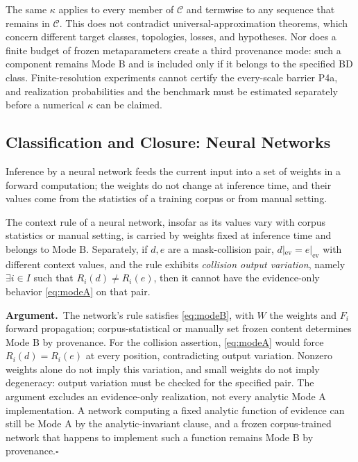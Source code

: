 \documentclass[twoside,11pt]{article}
\newcommand{\argument}{\par\medskip\noindent\textbf{Argument.}\ }
\newcommand{\qedbox}{\hfill$\square$}
\newcommand{\ev}{\mathrm{ev}}
\begin{document}
The same $\kappa$ applies to every member of $\mathcal{C}$ and termwise to any sequence that remains in $\mathcal{C}$. This does not contradict universal-approximation theorems, which concern different target classes, topologies, losses, and hypotheses. Nor does a finite budget of frozen metaparameters create a third provenance mode: such a component remains Mode B and is included only if it belongs to the specified BD class. Finite-resolution experiments cannot certify the every-scale barrier P4a, and realization probabilities and the benchmark must be estimated separately before a numerical $\kappa$ can be claimed.

\subsection{Classification and Closure: Neural Networks}

Inference by a neural network feeds the current input into a set of weights in a forward computation; the weights do not change at inference time, and their values come from the statistics of a training corpus or from manual setting.

\begin{proposition}
The context rule of a neural network, insofar as its values vary with corpus statistics or manual setting, is carried by weights fixed at inference time and belongs to Mode B. Separately, if $d,e$ are a mask-collision pair, $d|_{\ev}=e|_{\ev}$ with different context values, and the rule exhibits \emph{collision output variation}, namely $\exists i\in I$ such that $R_i(d)\neq R_i(e)$, then it cannot have the evidence-only behavior \eqref{eq:modeA} on that pair.
\end{proposition}

\argument The network's rule satisfies \eqref{eq:modeB}, with $W$ the weights and $F_i$ forward propagation; corpus-statistical or manually set frozen content determines Mode B by provenance. For the collision assertion, \eqref{eq:modeA} would force $R_i(d)=R_i(e)$ at every position, contradicting output variation. Nonzero weights alone do not imply this variation, and small weights do not imply degeneracy: output variation must be checked for the specified pair. The argument excludes an evidence-only realization, not every analytic Mode A implementation. A network computing a fixed analytic function of evidence can still be Mode A by the analytic-invariant clause, and a frozen corpus-trained network that happens to implement such a function remains Mode B by provenance.\qedbox
\end{document}
